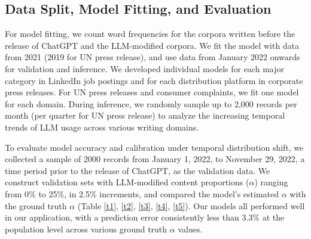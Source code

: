 \subsection*{Data Split, Model Fitting, and Evaluation}
\label{main:subsec:training-validation}



For model fitting, we count word frequencies for the corpora written before the release of ChatGPT and the LLM-modified corpora. We fit the model with data from 2021 (2019 for UN press release), and use data from January 2022 onwards for validation and inference. We developed individual models for each major category in LinkedIn job postings and for each distribution platform in corporate press releases. For UN press releases and consumer complaints, we fit one model for each domain. During inference, we randomly sample up to 2,000 records per month (per quarter for UN press release) to analyze the increasing temporal trends of LLM usage across various writing domains.

To evaluate model accuracy and calibration under temporal distribution shift, we collected a sample of 2000 records from January 1, 2022, to November 29, 2022, a time period prior to the release of ChatGPT, as the validation data. We construct validation sets with LLM-modified content proportions ($\alpha$) ranging from 0\% to 25\%, in 2.5\% increments, and compared the model's estimated $\alpha$ with the ground truth $\alpha$ (Table \ref{t1}, \ref{t2}, \ref{t3}, \ref{t4}, \ref{t5}). Our models all performed well in our application, with a prediction error consistently less than 3.3\% at the population level across various ground truth $\alpha$ values. 





